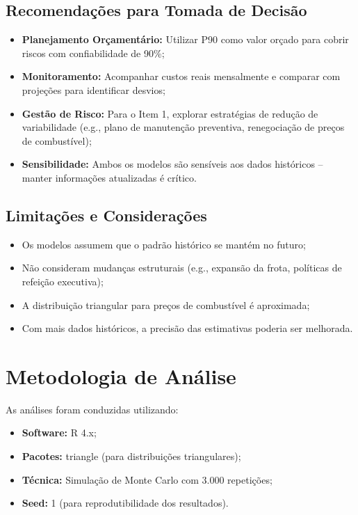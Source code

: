 \documentclass[12pt,a4paper]{article}
\begin{document}
\subsection{Recomendações para Tomada de Decisão}

\begin{itemize}
    \item \textbf{Planejamento Orçamentário:} Utilizar P90 como valor orçado para cobrir riscos com confiabilidade de 90\%;
    
    \item \textbf{Monitoramento:} Acompanhar custos reais mensalmente e comparar com projeções para identificar desvios;
    
    \item \textbf{Gestão de Risco:} Para o Item 1, explorar estratégias de redução de variabilidade (e.g., plano de manutenção preventiva, renegociação de preços de combustível);
    
    \item \textbf{Sensibilidade:} Ambos os modelos são sensíveis aos dados históricos -- manter informações atualizadas é crítico.
\end{itemize}

\subsection{Limitações e Considerações}

\begin{itemize}
    \item Os modelos assumem que o padrão histórico se mantém no futuro;
    \item Não consideram mudanças estruturais (e.g., expansão da frota, políticas de refeição executiva);
    \item A distribuição triangular para preços de combustível é aproximada;
    \item Com mais dados históricos, a precisão das estimativas poderia ser melhorada.
\end{itemize}

\section*{Metodologia de Análise}

As análises foram conduzidas utilizando:

\begin{itemize}
    \item \textbf{Software:} R 4.x;
    \item \textbf{Pacotes:} triangle (para distribuições triangulares);
    \item \textbf{Técnica:} Simulação de Monte Carlo com 3.000 repetições;
    \item \textbf{Seed:} 1 (para reprodutibilidade dos resultados).
\end{itemize}
\end{document}
